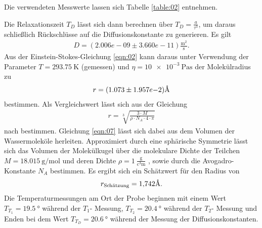 \FloatBarrier
\noindent Die verwendeten Messwerte lassen sich Tabelle \ref{table:02} entnehmen.
\FloatBarrier

\FloatBarrier
\noindent Die Relaxationszeit $T_D$ lässt sich dann berechnen über
$T_D = \frac{a}{\tau^3}$, um daraus schließlich Rückschlüsse auf die
Diffusionskonstante zu generieren. Es gilt
\begin{align*}
  D = (2.006e-09 \pm 3.660e-11) \frac{\si{\meter^2}}{\si{\second}}.
\end{align*}
\noindent Aus der Einstein-Stokes-Gleichung \ref{eqn:02} kann daraus unter Verwendung der
Parameter $T = \SI{293.75}{\kelvin}$ (gemessen) und $\eta = \SI{10e-3}{\pascal\second}$
\cite{Viskosität_Wasser} der Molekülradius zu
\begin{align*}
 r = (1.073\pm 1.957e{-2}) \text{\r{A}}
\end{align*}
\noindent bestimmen. Als Vergleichswert lässt sich aus der Gleichung
\begin{align}
  r = \sqrt[3]{\frac{3 \cdot M}{\rho \cdot N_A \cdot 4 \cdot \pi}}
  \label{eqn:07}
\end{align}
\noindent nach \cite{radius} bestimmen. Gleichung \ref{eqn:07} lässt sich dabei
aus dem Volumen der Wassermoleköle herleiten. Approximiert durch eine sphärische
Symmetrie lässt sich das Volumen der Molekülkugel über die molekulare
Dichte der Teilchen $M = \SI{18.015}{\gram\per\mol}$
und deren Dichte $\rho = 1 \: \frac{\si{\gram}}{\si{\cubic\centi\meter}}$
\cite{Viskosität_Wasser}, sowie durch die Avogadro-Konstante $N_A$ bestimmen.
Es ergibt sich ein Schätzwert für den Radius von
\begin{align*}
  r_\text{Schätzung} = \num{1.742} \text{\r{A}}.
\end{align*}
\noindent Die Temperaturmessungen am Ort der Probe beginnen mit einem Wert
$T_{T_1} = \SI{19.5}{\degree}$ während der $T_1$- Messung,
$T_{T_2} = \SI{20.4}{\degree}$ während der $T_2$- Messung und Enden bei dem Wert
$T_{T_D} = \SI{20.6}{\degree}$ während der Messung der Diffusionskonstanten.
